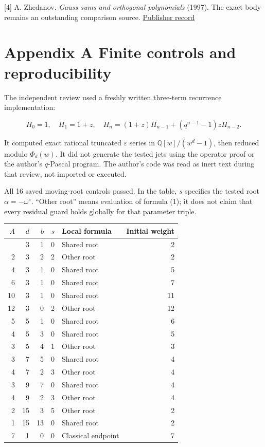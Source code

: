 \documentclass[
  11pt,
]{article}
\begin{document}
{[}4{]} A. Zhedanov. \emph{Gauss sums and orthogonal polynomials}
(1997). The exact body remains an outstanding comparison source.
\href{https://doi.org/10.1142/S0217751X97000438}{Publisher record}

\section{Appendix A Finite controls and
reproducibility}\label{appendix-a-finite-controls-and-reproducibility}

The independent review used a freshly written three-term recurrence
implementation:

\[
H_0=1,\quad H_1=1+z,\quad
H_n=(1+z)H_{n-1}+(q^{n-1}-1)zH_{n-2}.
\]

It computed exact rational truncated \(\varepsilon\) series in
\(\mathbb Q[w]/(w^d-1)\), then reduced modulo \(\Phi_d(w)\). It did not
generate the tested jets using the operator proof or the author's
\(q\)-Pascal program. The author's code was read as inert text during
that review, not imported or executed.

All 16 saved moving-root controls passed. In the table, \(s\) specifies
the tested root \(\alpha=-\omega^s\). ``Other root'' means evaluation of
formula (1); it does not claim that every residual guard holds globally
for that parameter triple.

\begin{longtable}[]{@{}rrrrlr@{}}
\toprule\noalign{}
\(A\) & \(d\) & \(b\) & \(s\) & Local formula & Initial weight \\
\midrule\noalign{}
\endhead
\bottomrule\noalign{}
\endlastfoot
1 & 3 & 1 & 0 & Shared root & 2 \\
2 & 3 & 2 & 2 & Other root & 2 \\
4 & 3 & 1 & 0 & Shared root & 5 \\
6 & 3 & 1 & 0 & Shared root & 7 \\
10 & 3 & 1 & 0 & Shared root & 11 \\
12 & 3 & 0 & 2 & Other root & 12 \\
5 & 5 & 1 & 0 & Shared root & 6 \\
4 & 5 & 3 & 0 & Shared root & 5 \\
3 & 5 & 4 & 1 & Other root & 3 \\
3 & 7 & 5 & 0 & Shared root & 4 \\
4 & 7 & 2 & 3 & Other root & 4 \\
3 & 9 & 7 & 0 & Shared root & 4 \\
4 & 9 & 2 & 3 & Other root & 4 \\
2 & 15 & 3 & 5 & Other root & 2 \\
1 & 15 & 13 & 0 & Shared root & 2 \\
7 & 1 & 0 & 0 & Classical endpoint & 7 \\
\end{longtable}
\end{document}
